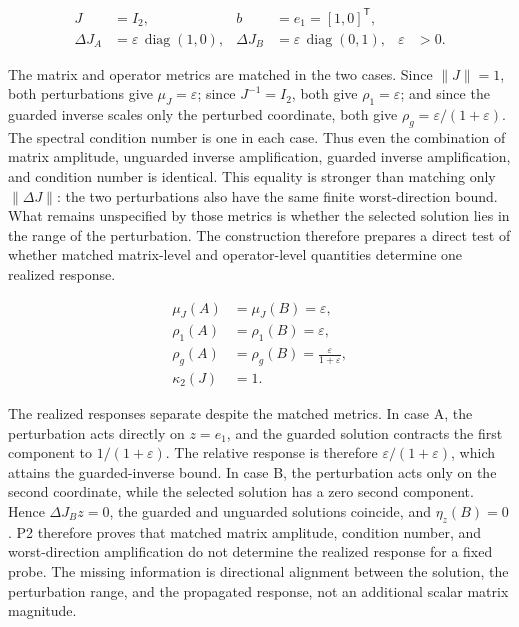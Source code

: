 \documentclass[preprint,12pt]{elsarticle}
\begin{document}
\begin{linenomath*}
\begin{equation}
\begin{aligned}
J&=I_2, & b&=e_1=[1,0]^{\mathsf T},\\
\Delta J_A&=\varepsilon\,\operatorname{diag}(1,0), &
\Delta J_B&=\varepsilon\,\operatorname{diag}(0,1), & \varepsilon&>0.
\end{aligned}
\label{eq:p2_construction}
\end{equation}
\end{linenomath*}

The matrix and operator metrics are matched in the two cases. Since $\lVert J \rVert=1$, both perturbations give $\mu_J = \varepsilon$; since $J^{-1}=I_2$, both give $\rho_1 = \varepsilon$; and since the guarded inverse scales only the perturbed coordinate, both give $\rho_g = \varepsilon/(1+\varepsilon)$. The spectral condition number is one in each case. Thus even the combination of matrix amplitude, unguarded inverse amplification, guarded inverse amplification, and condition number is identical. This equality is stronger than matching only $\lVert \Delta J \rVert$: the two perturbations also have the same finite worst-direction bound. What remains unspecified by those metrics is whether the selected solution lies in the range of the perturbation. The construction therefore prepares a direct test of whether matched matrix-level and operator-level quantities determine one realized response.

\begin{linenomath*}
\begin{equation}
\begin{aligned}
\mu_J(A)&=\mu_J(B)=\varepsilon,\\
\rho_1(A)&=\rho_1(B)=\varepsilon,\\
\rho_g(A)&=\rho_g(B)=\frac{\varepsilon}{1+\varepsilon},\\
\kappa_2(J)&=1.
\end{aligned}
\label{eq:p2_matched_metrics}
\end{equation}
\end{linenomath*}

The realized responses separate despite the matched metrics. In case A, the perturbation acts directly on $z=e_1$, and the guarded solution contracts the first component to $1/(1+\varepsilon)$. The relative response is therefore $\varepsilon/(1+\varepsilon)$, which attains the guarded-inverse bound. In case B, the perturbation acts only on the second coordinate, while the selected solution has a zero second component. Hence $\Delta J_B z=0$, the guarded and unguarded solutions coincide, and $\eta_z(B)=0$. P2 therefore proves that matched matrix amplitude, condition number, and worst-direction amplification do not determine the realized response for a fixed probe. The missing information is directional alignment between the solution, the perturbation range, and the propagated response, not an additional scalar matrix magnitude.
\end{document}
